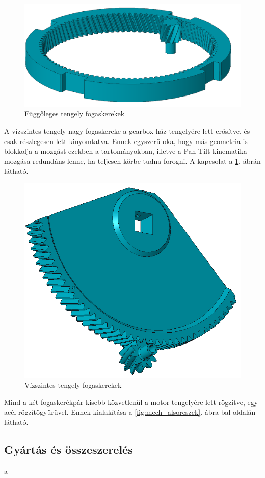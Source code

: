 \documentclass[12pt,a4paper]{article}
\begin{document}
\begin{figure}[h!]
	\centering
	\includegraphics[width=1\linewidth]{mech_fogpar1}
	\caption{Függőleges tengely fogaskerekek}
	\label{fig:mech_fogpar1}
\end{figure}

A vízszintes tengely nagy fogaskereke a gearbox ház tengelyére lett erősítve, és csak részlegesen lett kinyomtatva. Ennek egyszerű oka, hogy más geometria is blokkolja a mozgást ezekben a tartományokban, illetve a Pan-Tilt kinematika mozgása redundáns lenne, ha teljesen körbe tudna forogni. A kapcsolat a \ref{fig:mech_fogpar1}. ábrán látható.

\begin{figure}[h!]
	\centering
	\includegraphics[width=0.7\linewidth]{mech_fogpar2}
	\caption{Vízszintes tengely fogaskerekek}
	\label{fig:mech_fogpar2}
\end{figure}

Mind a két fogaskerékpár kisebb közvetlenül a motor tengelyére lett rögzítve, egy acél rögzítőgyűrűvel. Ennek kialakítása a \ref{fig:mech_alsoreszek}. ábra bal oldalán látható.

\subsection{Gyártás és összeszerelés}
a
\end{document}
